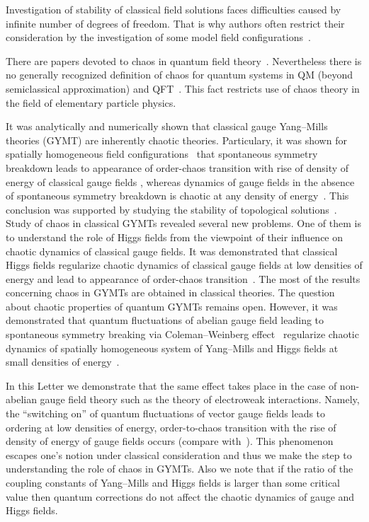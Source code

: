 \documentclass[a4paper,12pt]{article}
\begin{document}
Investigation of stability of classical field solutions faces difficulties caused by
infinite number of degrees of freedom. That is why authors often restrict their
consideration by the investigation of some model field configurations~\cite{Kawabe,
SHS, regular}.

There are papers devoted to chaos in quantum field theory~\cite{Q2,PLA}. Nevertheless
there is no generally recognized definition of chaos for quantum systems in QM (beyond
semiclassical approximation) and QFT~\cite{Bunakov}. This fact restricts use of chaos
theory in the field of elementary particle physics.

It was analytically \cite{Savvidy, Salasnich, we3} and numerically \cite{Kawabe,
regular} shown that classical gauge Yang--Mills theories (GYMT) are inherently chaotic
theories. Particulary, it was shown for spatially homogeneous field
configurations~\cite{SHS} that spontaneous symmetry breakdown leads to appearance of
order-chaos transition with rise of density of energy of classical gauge fields
\cite{regular, Salasnich, we3}, whereas
  dynamics of gauge fields in the absence of spontaneous symmetry breakdown is
  chaotic at any
 density of energy~\cite{Savvidy}. This conclusion was supported
 by studying the stability of topological solutions~\cite{Kawabe}. Study
 of chaos
 in classical GYMTs revealed several new problems. One of them is to understand
 the role of Higgs fields from the viewpoint of their influence on
  chaotic dynamics of classical gauge fields. It
 was demonstrated that classical Higgs fields regularize
  chaotic dynamics of classical gauge fields at low densities of energy and lead to appearance
 of order-chaos transition~\cite{Kawabe, regular}. The most of the results concerning
 chaos in GYMTs are obtained in classical theories. The question about
 chaotic properties of quantum GYMTs remains open. However, it was demonstrated that
 quantum fluctuations of abelian gauge field leading to spontaneous symmetry breaking
 via Coleman--Weinberg effect~\cite{effpot} regularize chaotic dynamics of spatially
 homogeneous system of Yang--Mills and Higgs fields at small densities of energy~\cite{1997}.

 In this Letter we demonstrate that the same effect takes place in the case of
 non-abelian gauge field theory such as the theory of electroweak interactions.
 Namely, the ``switching on'' of quantum fluctuations
 of vector gauge fields leads to ordering at low densities of energy,
 order-to-chaos transition with the rise of density of energy of gauge fields
 occurs (compare with~\cite{1997}).
 This phenomenon escapes one's notion under classical consideration and
 thus we make the step to understanding the role of chaos in GYMTs. Also
 we note that if the ratio of the coupling constants of Yang--Mills and Higgs fields is
 larger than some critical value then quantum corrections do not affect the chaotic
 dynamics of gauge and Higgs fields.
\end{document}
